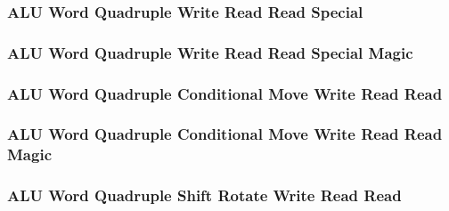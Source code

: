 \subsubsection[{\small ALU Word Quadruple Write Read Read Special}]{ALU Word Quadruple Write Read Read Special} \label{sec:format-ALU-WQWRRS}



\subsubsection[{\small ALU Word Quadruple Write Read Read Special Magic}]{ALU Word Quadruple Write Read Read Special Magic} \label{sec:format-ALU-WQWRRS.M}



\subsubsection[{\small ALU Word Quadruple Conditional Move Write Read Read}]{ALU Word Quadruple Conditional Move Write Read Read} \label{sec:format-ALU-WQCMWRR}



\subsubsection[{\small ALU Word Quadruple Conditional Move Write Read Read Magic}]{ALU Word Quadruple Conditional Move Write Read Read Magic} \label{sec:format-ALU-WQCMWRR.M}



\subsubsection[{\small ALU Word Quadruple Shift Rotate Write Read Read}]{ALU Word Quadruple Shift Rotate Write Read Read} \label{sec:format-ALU-WQSWRR}



